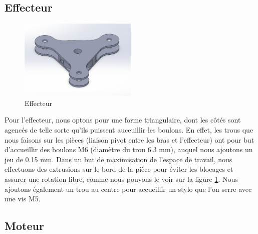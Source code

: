 \documentclass[a4paper, 11pt]{report}
\begin{document}
\subsection{Effecteur}


\begin{figure}[!tbh]
    \centering
    \includegraphics[width=0.5\textwidth]{Figures/effecteur.png}
    \caption{Effecteur}
    \label{fig:effecteur}
\end{figure}
Pour l'effecteur, nous optons pour une forme triangulaire, dont les côtés sont agencés de telle sorte qu'ils puissent auceuillir les boulons.
En effet, les trous que nous faisons sur les pièces (liaison pivot entre les bras et l'effecteur)
ont pour but d'accueillir des boulons M6 (diamètre du trou 6.3 mm), auquel nous ajoutons un jeu de 0.15 mm.
Dans un but de maximisation de l'espace de travail, nous effectuons des extrusions sur le bord de la pièce pour éviter les blocages et assurer une rotation libre,
comme nous pouvons le voir sur la figure \ref{fig:effecteur}. 
Nous ajoutons également un trou au centre pour accueillir un stylo que l'on serre avec une vis M5.

\subsection{Moteur}

\end{document}
